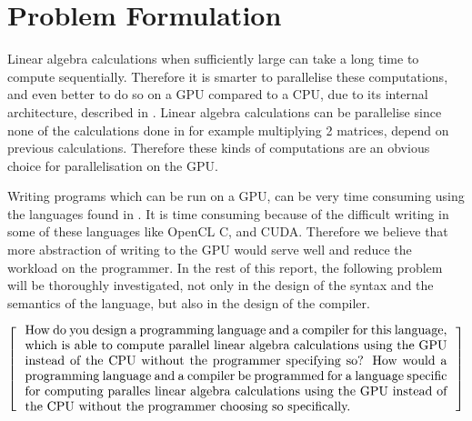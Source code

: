 \newpage
\section{Problem Formulation}

Linear algebra calculations when sufficiently large can take a long time to compute sequentially. 
Therefore it is smarter to parallelise these computations, and even better to do so on a GPU compared to a CPU, due to its internal architecture, described in .
Linear algebra calculations can be parallelise since none of the calculations done in for example multiplying 2 matrices, depend on previous calculations.
Therefore these kinds of computations are an obvious choice for parallelisation on the GPU.

Writing programs which can be run on a GPU, can be very time consuming using the languages found in .
It is time consuming because of the difficult writing in some of these languages like OpenCL C, and CUDA.
Therefore we believe that more abstraction of writing to the GPU would serve well and reduce the workload on the programmer.
In the rest of this report, the following problem will be thoroughly investigated, not only in the design of the syntax and the semantics of the language, but also in the design of the compiler.

\[
  \left[
  \begin{minipage}{\textwidth}
  \centering
  \begin{minipage}{0.96\textwidth}
  How do you design a programming language and a compiler for this language, which is able to compute parallel linear algebra calculations using the GPU instead of the CPU without the programmer specifying so?
  How would a programming language and a compiler be programmed for a language specific for computing paralles linear algebra calculations using the GPU instead of the CPU without the programmer choosing so specifically.  
  \end{minipage}
  \end{minipage}
    \right]
\]